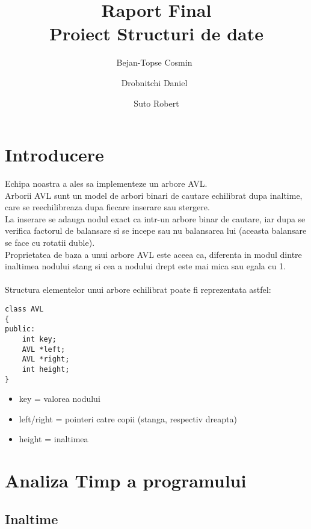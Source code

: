 \documentclass[12pt]{article}
\begin{document}
\title{\textbf{Raport Final\\ Proiect Structuri de date}}
\date{}
\author{
  Bejan-Topse Cosmin\
  \texttt{}
  \and
  Drobnitchi Daniel\
  \texttt{}
	\and
	Suto Robert
}
\maketitle
\newpage
  
\tableofcontents
\newpage
\section{Introducere}
Echipa noastra a ales sa implementeze un arbore AVL. \\ Arborii AVL sunt un model de arbori binari de cautare echilibrat dupa inaltime, care se reechilibreaza dupa fiecare inserare sau stergere.\\
La inserare se adauga nodul exact ca intr-un arbore binar de cautare, iar dupa se verifica factorul de balansare si se incepe sau nu balansarea lui (aceasta balansare se face cu rotatii duble).\\
Proprietatea de baza a unui arbore AVL este aceea ca, diferenta in modul dintre inaltimea nodului stang si cea a nodului drept este mai mica sau egala cu 1.\\ \\
Structura elementelor unui arbore echilibrat poate fi reprezentata astfel:

\begin{verbatim}
class AVL
{
public:
    int key;
    AVL *left;
    AVL *right;
    int height;
}

\end{verbatim}




\begin{itemize}
  \item key = valorea nodului
  \item left/right = pointeri catre copii (stanga, respectiv dreapta)
  \item height = inaltimea
\end{itemize}

\section{Analiza Timp a programului}
\subsection{Inaltime}
\end{document}

